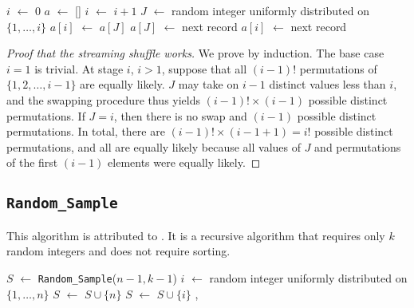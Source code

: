 \documentclass[12pt]{article}
\newcommand*\Let[2]{\State #1 $\gets$ #2}
\newcommand{\todo}[1]{{\color{red}{TO DO: \sc #1}}}
\begin{document}
\begin{algorithm}                      %
\caption{Fisher-Yates-Knuth-Durstenfeld shuffle (streaming version)}          %
\label{FYKD-streaming}                           %
\begin{algorithmic}[1]               %
\Let{$i$}{0}
\Let{$a$}{[]}
    \Let{$i$}{$i+1$}
    \Let{$J$}{random integer uniformly distributed on $\{1, \dots, i\}$}
        \Let{$a[i]$}{$a[J]$}
        \Let{$a[J]$}{next record}
    \Else
        \Let{$a[i]$}{next record} 
    \EndIf
\EndWhile \\
\end{algorithmic}
\end{algorithm}


\begin{proof}[Proof that the streaming shuffle works]
We prove by induction. The base case $i=1$ is trivial.
At stage $i$, $i>1$, suppose that all $(i-1)!$ permutations of $\{1, 2, \dots, i-1\}$ are equally likely.
$J$ may take on $i-1$ distinct values less than $i$, and the swapping procedure thus yields $(i-1)! \times (i-1)$
possible distinct permutations.
If $J = i$, then there is no swap and $(i-1)$ possible distinct permutations.
In total, there are $(i-1)! \times (i-1 + 1) = i!$ possible distinct permutations, and all are equally likely because
all values of $J$ and permutations of the first $(i-1)$ elements were equally likely.
\end{proof}


\subsection{\texttt{Random\_Sample}}
This algorithm is attributed to \citet{cormen_introduction_2009}.
It is a recursive algorithm that requires only $k$ random integers and does not require sorting.
\todo{prove by recursion that the method works}


\begin{algorithm}                      %
\caption{$Random\_Sample$}
\label{Random_Sample}
\begin{algorithmic}[1]               %
\Statex
{}
\Else
     \Let{$S$}{\texttt{Random\_Sample}($n-1, k-1$)}
     \Let{$i$}{random integer uniformly distributed on $\{1, \dots, n\}$} 
           \Let{$S$}{$S \cup \{n\}$}
     \Else
            \Let{$S$}{$S\cup\{i\}$}  
     \EndIf, 
\EndIf
\EndFunction
\end{algorithmic}
\end{algorithm}
\end{document}
